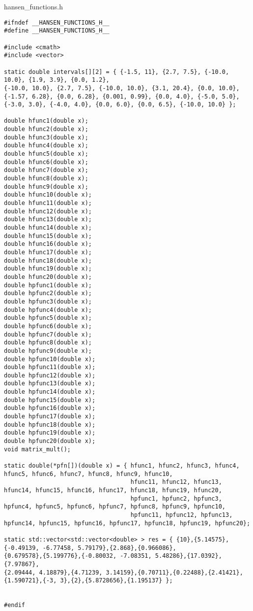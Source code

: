 \documentclass{report}
\begin{document}
hansen\_functions.h
\begin{lstlisting}
#ifndef __HANSEN_FUNCTIONS_H__
#define __HANSEN_FUNCTIONS_H__

#include <cmath>
#include <vector>

static double intervals[][2] = { {-1.5, 11}, {2.7, 7.5}, {-10.0, 10.0}, {1.9, 3.9}, {0.0, 1.2},
{-10.0, 10.0}, {2.7, 7.5}, {-10.0, 10.0}, {3.1, 20.4}, {0.0, 10.0},
{-1.57, 6.28}, {0.0, 6.28}, {0.001, 0.99}, {0.0, 4.0}, {-5.0, 5.0},
{-3.0, 3.0}, {-4.0, 4.0}, {0.0, 6.0}, {0.0, 6.5}, {-10.0, 10.0} };

double hfunc1(double x);
double hfunc2(double x);
double hfunc3(double x);
double hfunc4(double x);
double hfunc5(double x);
double hfunc6(double x);
double hfunc7(double x);
double hfunc8(double x);
double hfunc9(double x);
double hfunc10(double x);
double hfunc11(double x);
double hfunc12(double x);
double hfunc13(double x);
double hfunc14(double x);
double hfunc15(double x);
double hfunc16(double x);
double hfunc17(double x);
double hfunc18(double x);
double hfunc19(double x);
double hfunc20(double x);
double hpfunc1(double x);
double hpfunc2(double x);
double hpfunc3(double x);
double hpfunc4(double x);
double hpfunc5(double x);
double hpfunc6(double x);
double hpfunc7(double x);
double hpfunc8(double x);
double hpfunc9(double x);
double hpfunc10(double x);
double hpfunc11(double x);
double hpfunc12(double x);
double hpfunc13(double x);
double hpfunc14(double x);
double hpfunc15(double x);
double hpfunc16(double x);
double hpfunc17(double x);
double hpfunc18(double x);
double hpfunc19(double x);
double hpfunc20(double x);
void matrix_mult();

static double(*pfn[])(double x) = { hfunc1, hfunc2, hfunc3, hfunc4, hfunc5, hfunc6, hfunc7, hfunc8, hfunc9, hfunc10,
                                    hfunc11, hfunc12, hfunc13, hfunc14, hfunc15, hfunc16, hfunc17, hfunc18, hfunc19, hfunc20,
                                    hpfunc1, hpfunc2, hpfunc3, hpfunc4, hpfunc5, hpfunc6, hpfunc7, hpfunc8, hpfunc9, hpfunc10,
                                    hpfunc11, hpfunc12, hpfunc13, hpfunc14, hpfunc15, hpfunc16, hpfunc17, hpfunc18, hpfunc19, hpfunc20};

static std::vector<std::vector<double> > res = { {10},{5.14575},{-0.49139, -6.77458, 5.79179},{2.868},{0.966086},
{0.679578},{5.199776},{-0.80032, -7.08351, 5.48286},{17.0392},{7.97867},
{2.09444, 4.18879},{4.71239, 3.14159},{0.70711},{0.22488},{2.41421},
{1.590721},{-3, 3},{2},{5.8728656},{1.195137} };


#endif  
\end{lstlisting}
\end{document}
